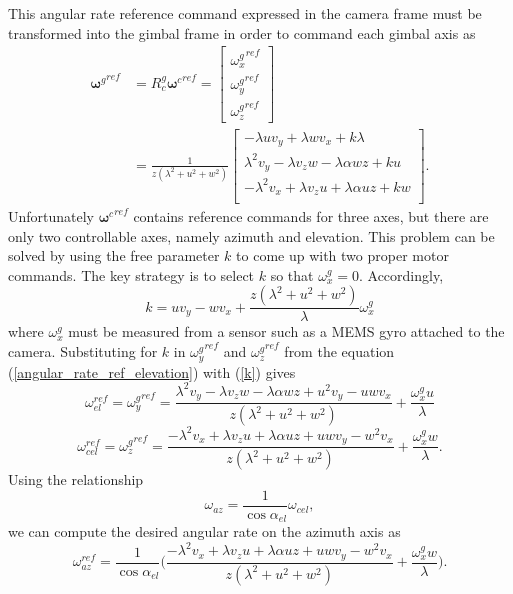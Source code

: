 This angular rate reference command expressed in the camera frame must be transformed into the gimbal frame in order to command each gimbal axis as
\begin{align}
{\mathbf{\omega}^g}^{ref}&=R_c^g{\mathbf{\omega}^c}^{ref}
=\begin{bmatrix}
{\omega_x^g}^{ref} \\ {\omega_y^g}^{ref} \\ {\omega_z^g}^{ref}
\end{bmatrix}
\\&=\frac{1}{z(\lambda^2+u^2+w^2)}\begin{bmatrix}
-\lambda u v_y+\lambda w v_x +k\lambda \\
\lambda^2 v_y-\lambda v_z w -\lambda \alpha wz+ku \\
-\lambda^2 v_x+\lambda v_zu +\lambda \alpha uz+kw \\
\end{bmatrix}.
\label{angular_rate_ref_elevation}
\end{align}
Unfortunately ${\mathbf{\omega}^c}^{ref}$ contains reference commands for three axes, but there are only two controllable axes, namely azimuth and elevation. This problem can be solved by using the free parameter $k$ to come up with two proper motor commands. The key strategy is to select $k$ so that $\omega_x^g=0$. Accordingly,  
\begin{equation}
k=uv_y-wv_x+\frac{z(\lambda^2+u^2+w^2)}{\lambda}\omega_x^g
\label{k}
\end{equation}
where $\omega_x^g$ must be measured from a sensor such as a MEMS gyro attached to the camera. Substituting for $k$ in ${\omega_y^g}^{ref}$ and ${\omega_z^g}^{ref}$ from the equation (\ref{angular_rate_ref_elevation}) with (\ref{k}) gives
\begin{equation}
\omega_{el}^{ref}={\omega_y^g}^{ref}=\frac{\lambda^2 v_y-\lambda v_z w -\lambda \alpha wz+u^2 v_y-uwv_x}{z(\lambda^2+u^2+w^2)}+\frac{\omega_x^g u}{\lambda}
\end{equation}
\begin{equation}
\omega_{cel}^{ref}={\omega_z^g}^{ref}=\frac{-\lambda^2 v_x+\lambda v_z u+\lambda \alpha uz +uwv_y -w^2 v_x}{z(\lambda^2+u^2+w^2)}+\frac{\omega_x^g w}{\lambda}.
\end{equation}
Using the relationship 
\begin{equation}
\omega_{az}=\frac{1}{\cos\alpha_{el}}\omega_{cel},
\end{equation}
we can compute the desired angular rate on the azimuth axis as
\begin{equation}
\omega_{az}^{ref}=\frac{1}{\cos \alpha_{el}}\bigg(\frac{-\lambda^2 v_x+\lambda v_z u+\lambda \alpha uz +uwv_y -w^2 v_x}{z(\lambda^2+u^2+w^2)}+\frac{\omega_x^g w}{\lambda}\bigg).
\end{equation}
